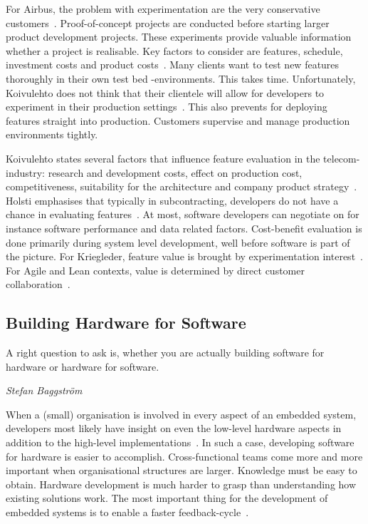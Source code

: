 \documentclass[english]{tktltiki2}
\begin{document}
For Airbus, the problem with experimentation are the very conservative customers~\cite{Koi15}. Proof-of-concept projects are conducted before starting larger product development projects. These experiments provide valuable information whether a project is realisable. Key factors to consider are features, schedule, investment costs and product costs~\cite{Koi15}. Many clients want to test new features thoroughly in their own test bed -environments. This takes time. Unfortunately, Koivulehto does not think that their clientele will allow for developers to experiment in their production settings~\cite{Koi15}. This also prevents for deploying features straight into production. Customers supervise and manage production environments tightly.

Koivulehto states several factors that influence feature evaluation in the telecom-industry: research and development costs, effect on production cost, competitiveness, suitability for the architecture and company product strategy~\cite{Koi15}. Holsti emphasises that typically in subcontracting, developers do not have a chance in evaluating features~\cite{Hol15b}. At most, software developers can negotiate on for instance software performance and data related factors. Cost-benefit evaluation is done primarily during system level development, well before software is part of the picture. For Kriegleder, feature value is brought by experimentation interest~\cite{Kri15}. For Agile and Lean contexts, value is determined by direct customer collaboration~\cite{BT15, Pet15}.

\subsection{Building Hardware for Software}

\epigraph{A right question to ask is, whether you are actually building software for hardware or hardware for software.}{\textit{Stefan Baggström~\cite{BT15}}}

When a (small) organisation is involved in every aspect of an embedded system, developers most likely have insight on even the low-level hardware aspects in addition to the high-level implementations~\cite{Kri15}. In such a case, developing software for hardware is easier to accomplish. Cross-functional teams come more and more important when organisational structures are larger. Knowledge must be easy to obtain. Hardware development is much harder to grasp than understanding how existing solutions work. The most important thing for the development of embedded systems is to enable a faster feedback-cycle~\cite{BT15, Hol15a}.
\end{document}
